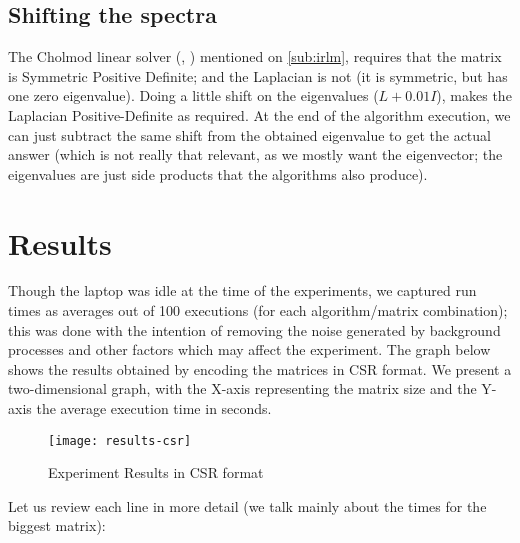 \subsection{Shifting the spectra}

The \gls{Cholmod} linear solver (\cite{cholmod08},
  \cite{cholmod08a}) mentioned on \cref{sub:irlm}, requires
that the matrix is Symmetric Positive Definite; and the \gls{Laplacian} is
not (it is symmetric, but has
one zero eigenvalue). Doing a little shift on the eigenvalues ($L +
0.01I$), makes the \gls{Laplacian} Positive-Definite as required. At the
end of the algorithm execution, we can just subtract the same shift from
the obtained eigenvalue to get the actual answer (which is not really
that relevant, as we mostly want the eigenvector; the eigenvalues are
just side products that the algorithms also produce). 

\section{Results}

Though the laptop was idle at the time of the experiments, we captured
run times as averages out of 100 executions (for each
algorithm/matrix combination); this was done with the intention of
removing the noise generated by background processes and other factors
which may affect the experiment. The graph below shows the results
obtained by encoding the matrices in CSR format. We present a
two-dimensional graph, with the X-axis representing the matrix size
and the Y-axis the average execution time in seconds. 

\begin{figure}[H]
  \centering
  \caption{Experiment Results in CSR format}  
  \texttt{[image: results-csr]}
\end{figure}

Let us review each line in more detail (we talk mainly about the times
for the biggest matrix):

